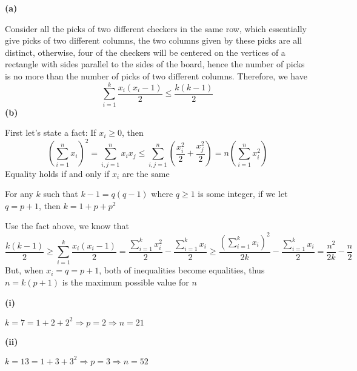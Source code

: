 \documentclass[../main.tex]{subfiles}
\begin{document}
\begin{problem}
\textbf{(a)} \par
Consider all the picks of two different checkers in the same row, which essentially give picks of two different columns, the two columns given by these picks are all distinct, otherwise, four of the checkers will be centered on the vertices of a rectangle with sides parallel to the sides of the board, hence the number of picks is no more than the number of picks of two different columns. Therefore, we have
\[
\sum_{i=1}^{k}\dfrac{x_i(x_i-1)}{2}\leq\dfrac{k(k-1)}{2}
\]
\textbf{(b)} \par
First let's state a fact: If $x_i\geq 0$, then
\[
\displaystyle\left(\sum_{i=1}^nx_i\right)^2=\sum_{i,j=1}^{n}x_ix_j\leq\sum_{i,j=1}^{n}\left(\frac{x_i^2}{2}+\frac{x_j^2}{2}\right)=n\left(\sum_{i=1}^nx_i^2\right)
\]
Equality holds if and only if $x_i$ are the same \par
For any $k$ such that $k-1=q(q-1)$ where $q\geq 1$ is some integer, if we let $q=p+1$, then $k=1+p+p^2$ \par
Use the fact above, we know that
\[
\dfrac{k(k-1)}{2}\geq\sum_{i=1}^{k}\dfrac{x_i(x_i-1)}{2}=\dfrac{\sum_{i=1}^{k}x_i^2}{2}-\dfrac{\sum_{i=1}^{k}x_i}{2}\geq\dfrac{\left(\sum_{i=1}^{k}x_i\right)^2}{2k}-\dfrac{\sum_{i=1}^{k}x_i}{2}=\dfrac{n^2}{2k}-\dfrac{n}{2}
\]
But, when $x_i=q=p+1$, both of inequalities become equalities, thus $n=k(p+1)$ is the maximum possible value for $n$ \par
\textbf{(i)} \par
$k=7=1+2+2^2\Rightarrow p=2\Rightarrow n=21$ \par
\textbf{(ii)} \par
$k=13=1+3+3^2\Rightarrow p=3\Rightarrow n=52$ \par
\end{problem}
\end{document}
